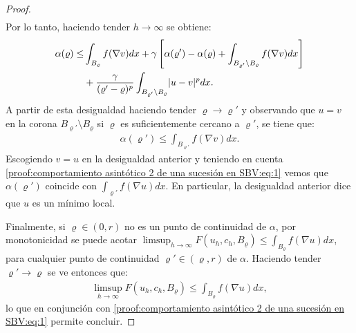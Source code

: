 \documentclass[a4paper,11pt,spanish, twoside, leqno]{tfm-uam}
\begin{document}
\begin{proof}
\begin{align*}
\end{align*}
Por lo tanto, haciendo tender $h\to \infty$ se obtiene:
\begin{align*}
\alpha(\varrho)\leq &\int_{B_{\varrho}}f(\nabla{v})dx+\gamma \left [ \alpha(\varrho')-\alpha(\varrho)+\int_{B_{\varrho'}\setminus B_{\varrho}}f(\nabla{v})dx\right]\\&+\dfrac{\gamma}{(\varrho'-\varrho)^{p}}\int_{B_{\varrho'}\setminus B_{\varrho}}\lvert u-v\rvert^{p}dx.
\end{align*}
A partir de esta desigualdad haciendo tender $\varrho\to \varrho'$ y observando que $u=v$ en la corona $B_{\varrho'}\setminus B_{\varrho}$ si $\varrho$ es suficientemente cercano a $\varrho'$, se tiene que:
\begin{align*}
\alpha(\varrho')\leq \int_{B_{\varrho'}}f(\nabla{v})dx.
\end{align*}
Escogiendo $v=u$ en la desigualdad anterior y teniendo en cuenta \ref{proof:comportamiento asintótico 2 de una sucesión en SBV:eq:1} vemos que $\alpha(\varrho')$ coincide con $\int_{\varrho'}f(\nabla{u})dx$. En particular, la desigualdad anterior dice que $u$ es un mínimo local.

Finalmente, si $\varrho\in (0,r)$ no es un punto de continuidad de $\alpha$, por monotonicidad se puede acotar $\limsup_{h\to \infty} F(u_{h}, c_{h}, B_{\varrho})\leq \int_{B_{\varrho}}f(\nabla{u})dx$, para cualquier punto de continuidad $\varrho'\in (\varrho,r)$ de $\alpha$. Haciendo tender $\varrho'\to \varrho$ se ve entonces que:
\begin{align*}
\limsup_{h\to \infty} F(u_{h}, c_{h}, B_{\varrho})\leq \int_{B_{\varrho}}f(\nabla{u})dx,
\end{align*}
lo que en conjunción con \ref{proof:comportamiento asintótico 2 de una sucesión en SBV:eq:1} permite concluir.
\end{proof}
\end{document}
